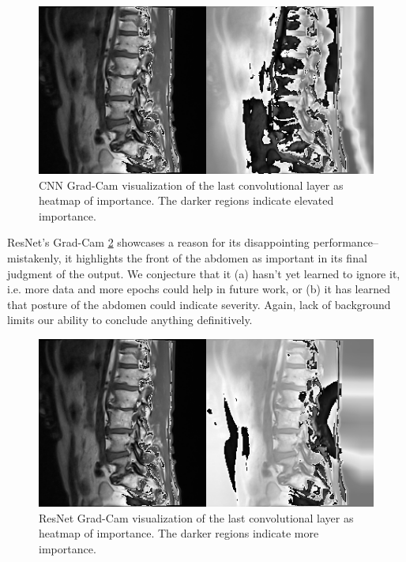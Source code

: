 \documentclass[conference]{IEEEtran}
\begin{document}
\begin{figure}
    \centering
    \includegraphics[width=1.0\linewidth]{visuals/CNN_interpretation.png}
    \caption{CNN Grad-Cam visualization of the last convolutional layer as heatmap of importance. The darker regions indicate elevated importance.
    }
    \label{fig:interpret_cnn}
\end{figure}

ResNet's Grad-Cam \ref{fig:interpret_resnet} showcases a reason for its disappointing performance--mistakenly, it highlights the front of the abdomen as important in its final judgment of the output. We conjecture that it (a) hasn't yet learned to ignore it, i.e. more data and more epochs could help in future work, or (b) it has learned that posture of the abdomen could indicate severity. Again, lack of background limits our ability to conclude anything definitively.

\begin{figure}
    \centering
    \includegraphics[width=1.0\linewidth]{visuals/ResNet_interpretation.png}
    \caption{ResNet Grad-Cam visualization of the last convolutional layer as heatmap of importance. The darker regions indicate more importance.
    }
    \label{fig:interpret_resnet}
\end{figure}
\end{document}
